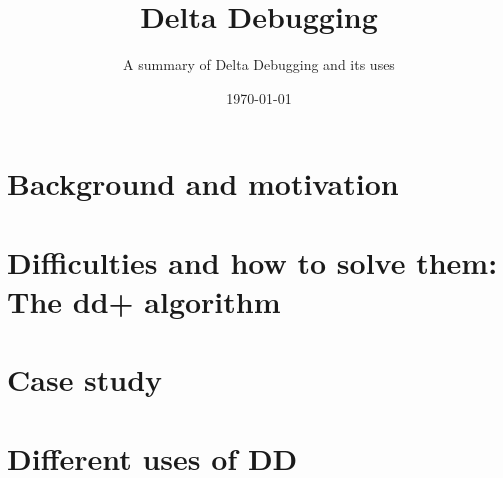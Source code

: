 


\title[Delta Debugging]{Delta Debugging}
\subtitle{A summary of Delta Debugging and its uses}
\date{\today}




\titleframe

\section{Background and motivation}


\section{Difficulties and how to solve them: The dd+ algorithm}



\section{Case study}


\section{Different uses of DD}


